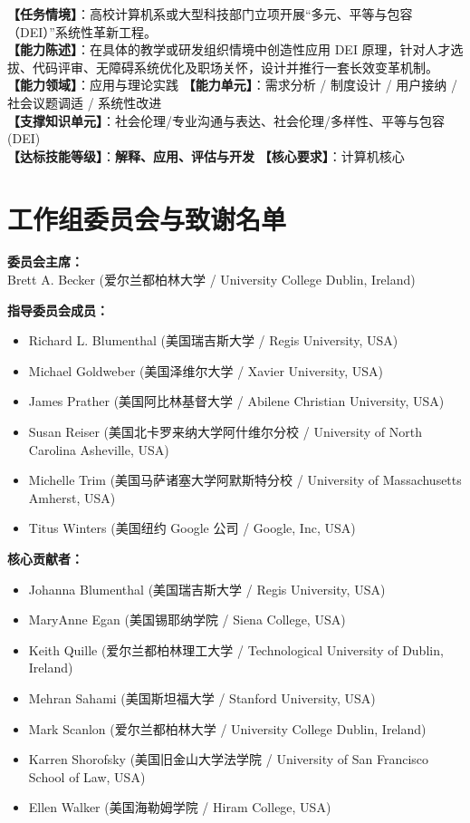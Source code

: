 \begin{taskbox}
\textbf{【任务情境】}：高校计算机系或大型科技部门立项开展“多元、平等与包容（DEI）”系统性革新工程。\\
\textbf{【能力陈述】}：在具体的教学或研发组织情境中创造性应用 DEI 原理，针对人才选拔、代码评审、无障碍系统优化及职场关怀，设计并推行一套长效变革机制。\\
\textbf{【能力领域】}：应用与理论实践 \quad \textbf{【能力单元】}：需求分析 / 制度设计 / 用户接纳 / 社会议题调适 / 系统性改进\\
\textbf{【支撑知识单元】}：社会伦理/专业沟通与表达、社会伦理/多样性、平等与包容 (DEI)\\
\textbf{【达标技能等级】}：\textbf{解释、应用、评估与开发} \quad \textbf{【核心要求】}：计算机核心
\end{taskbox}

\section{工作组委员会与致谢名单}

\textbf{委员会主席：}\\
Brett A. Becker (爱尔兰都柏林大学 / University College Dublin, Ireland)

\textbf{指导委员会成员：}
\begin{itemize}
    \item Richard L. Blumenthal (美国瑞吉斯大学 / Regis University, USA)
    \item Michael Goldweber (美国泽维尔大学 / Xavier University, USA)
    \item James Prather (美国阿比林基督大学 / Abilene Christian University, USA)
    \item Susan Reiser (美国北卡罗来纳大学阿什维尔分校 / University of North Carolina Asheville, USA)
    \item Michelle Trim (美国马萨诸塞大学阿默斯特分校 / University of Massachusetts Amherst, USA)
    \item Titus Winters (美国纽约 Google 公司 / Google, Inc, USA)
\end{itemize}

\textbf{核心贡献者：}
\begin{itemize}
    \item Johanna Blumenthal (美国瑞吉斯大学 / Regis University, USA)
    \item MaryAnne Egan (美国锡耶纳学院 / Siena College, USA)
    \item Keith Quille (爱尔兰都柏林理工大学 / Technological University of Dublin, Ireland)
    \item Mehran Sahami (美国斯坦福大学 / Stanford University, USA)
    \item Mark Scanlon (爱尔兰都柏林大学 / University College Dublin, Ireland)
    \item Karren Shorofsky (美国旧金山大学法学院 / University of San Francisco School of Law, USA)
    \item Ellen Walker (美国海勒姆学院 / Hiram College, USA)
\end{itemize}

